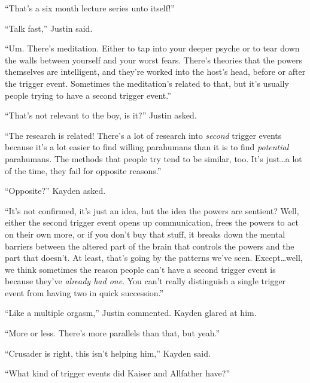 ``That's a six month lecture series unto itself!''



``Talk fast,'' Justin said.



``Um.  There's meditation.  Either to tap into your deeper psyche or to tear down the walls between yourself and your worst fears.  There's theories that the powers themselves are intelligent, and they're worked into the host's head, before or after the trigger event.  Sometimes the meditation's related to that, but it's usually people trying to have a second trigger event.''



``That's not relevant to the boy, is it?'' Justin asked.



``The research is related!  There's a lot of research into \emph{second} trigger events because it's a lot easier to find willing parahumans than it is to find \emph{potential} parahumans.  The methods that people try tend to be similar, too.  It's just\ldots a lot of the time, they fail for opposite reasons.''



``Opposite?''  Kayden asked.



``It's not confirmed, it's just an idea, but the idea the powers are sentient?  Well, either the second trigger event opens up communication, frees the powers to act on their own more, or if you don't buy that stuff, it breaks down the mental barriers between the altered part of the brain that controls the powers and the part that doesn't.  At least, that's going by the patterns we've seen.  Except\ldots well, we think sometimes the reason people can't have a second trigger event is because they've \emph{already had one}.  You can't really distinguish a single trigger event from having two in quick succession.''



``Like a multiple orgasm,'' Justin commented.  Kayden glared at him.



``More or less.  There's more parallels than that, but yeah.''



``Crusader is right, this isn't helping him,'' Kayden said.



``What kind of trigger events did Kaiser and Allfather have?''



